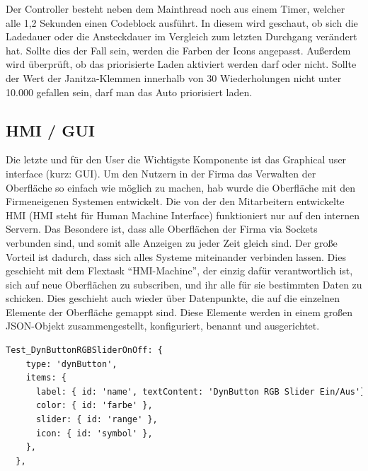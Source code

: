 Der Controller besteht neben dem Mainthread noch aus einem Timer, welcher alle 1,2 Sekunden einen Codeblock ausführt. In diesem wird geschaut, ob sich die Ladedauer oder die Ansteckdauer im Vergleich zum letzten Durchgang verändert hat. Sollte dies der Fall sein, werden die Farben der Icons angepasst. Außerdem wird überprüft, ob das priorisierte Laden aktiviert werden darf oder nicht. Sollte der Wert der Janitza-Klemmen innerhalb von 30 Wiederholungen nicht unter 10.000 gefallen sein, darf man das Auto priorisiert laden.

\subsection{HMI / GUI} 
Die letzte und für den User die Wichtigste Komponente ist das Graphical user interface (kurz: GUI). Um den Nutzern in der Firma das Verwalten der Oberfläche so einfach wie möglich zu machen, hab wurde die Oberfläche mit den Firmeneigenen Systemen entwickelt. Die von der den Mitarbeitern entwickelte HMI (HMI steht für Human Machine Interface) funktioniert nur auf den internen Servern. Das Besondere ist, dass alle Oberflächen der Firma via Sockets verbunden sind, und somit alle Anzeigen zu jeder Zeit gleich sind. Der große Vorteil ist dadurch, dass sich alles Systeme miteinander verbinden lassen. Dies geschieht mit dem Flextask “HMI-Machine”, der einzig dafür verantwortlich ist, sich auf neue Oberflächen zu subscriben, und ihr alle für sie bestimmten Daten zu schicken. Dies geschieht auch wieder über Datenpunkte, die auf die einzelnen Elemente der Oberfläche gemappt sind. Diese Elemente werden in einem großen JSON-Objekt zusammengestellt, konfiguriert, benannt und ausgerichtet. 

\begin{lstlisting}[language=HTML,caption=Example Element,label=lst:impl:foo]
  Test_DynButtonRGBSliderOnOff: { 
    type: 'dynButton', 
    items: { 
      label: { id: 'name', textContent: 'DynButton RGB Slider Ein/Aus'}, 
      color: { id: 'farbe' }, 
      slider: { id: 'range' }, 
      icon: { id: 'symbol' }, 
    }, 
  }, 
\end{lstlisting}


